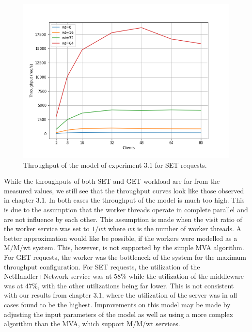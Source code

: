 \documentclass[11pt,a4paper]{article}
\begin{document}
\begin{figure}
\centering
\includegraphics[width=.8\textwidth]{71/71_31set.png}
\caption{Throughput of the model of experiment 3.1 for SET requests.}
\label{fig:71_set}
\end{figure}

While the throughputs of both SET and GET workload are far from the measured values, we still see that the throughput curves look like those observed in chapter 3.1. In both cases the throughput of the model is much too high. This is due to the assumption that the worker threads operate in complete parallel and are not influence by each other. This assumption is made when the visit ratio of the worker service was set to $1/wt$ where $wt$ is the number of worker threads. A better approximation would like be possible, if the workers were modelled as a M/M/wt system. This, however, is not supported by the simple MVA algorithm. For GET requests, the worker was the bottleneck of the system for the maximum throughput configuration. For SET requests, the utilization of the NetHandler+Network service was at 58\% while the utilization of the middleware was at 47\%, with the other utilizations being far lower. This is not consistent with our results from chapter 3.1, where the utilization of the server was in all cases found to be the highest. Improvements on this model may be made by adjusting the input parameters of the model as well as using a more complex algorithm than the MVA, which support M/M/wt services.
\end{document}
